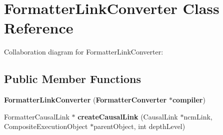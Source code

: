 \section{FormatterLinkConverter Class Reference}
\label{classbr_1_1pucrio_1_1telemidia_1_1ginga_1_1ncl_1_1emconverter_1_1FormatterLinkConverter}
Collaboration diagram for FormatterLinkConverter:\subsection*{Public Member Functions}
\begin{CompactItemize}
\item 
\textbf{FormatterLinkConverter} ({\bf FormatterConverter} $\ast${\bf compiler})\label{classbr_1_1pucrio_1_1telemidia_1_1ginga_1_1ncl_1_1emconverter_1_1FormatterLinkConverter_f5b1c2393b5314012f6be212a9755cb3}

\item 
FormatterCausalLink $\ast$ \textbf{createCausalLink} (CausalLink $\ast$ncmLink, CompositeExecutionObject $\ast$parentObject, int depthLevel)\label{classbr_1_1pucrio_1_1telemidia_1_1ginga_1_1ncl_1_1emconverter_1_1FormatterLinkConverter_5a997bf6ebdc2e69e0f9d1e2c07d2b35}

\end{CompactItemize}
